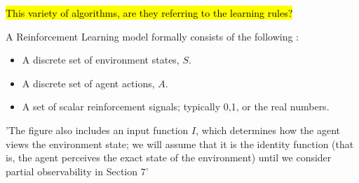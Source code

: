 
\hl{This variety of algorithms, are they referring to the learning rules?}


A Reinforcement Learning model formally consists of the following \cite{KaelblingLittmanMoore1996}:
\begin{itemize}
	\item A discrete set of environment states, $S$.
	\item A discrete set of agent actions, $A$.
	\item A set of scalar reinforcement signals; typically {0,1}, or the real numbers.
\end{itemize}

'The figure also includes an input function $I$, which determines how the agent views the environment state; we will assume that it is the identity function (that is, the agent perceives the exact state of the environment) until we consider partial observability in Section 7' \cite{KaelblingLittmanMoore1996}


